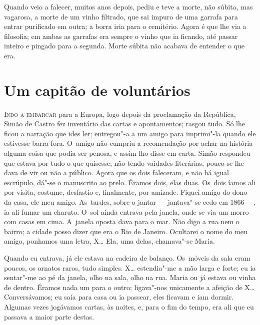 \begin{linenumbers}
Quando veio a falecer, muitos anos depois, pediu e teve a morte, não
súbita, mas vagarosa, a morte de um vinho filtrado, que sai impuro de
uma garrafa para entrar purificado em outra; a borra iria para o
cemitério. Agora é que lhe via a filosofia; em ambas as garrafas era
sempre o vinho que ia ficando, até passar inteiro e pingado para a
segunda. Morte súbita não acabava de entender o que era.

\end{linenumbers}

\chapter{Um capitão de voluntários}

\begin{linenumbers}

\textsc{Indo a embarcar} para a Europa, logo depois da proclamação da República,
Simão de Castro fez inventário das cartas e apontamentos; rasgou tudo.
Só lhe ficou a narração que ides ler; entregou"-a a um amigo para
imprimi"-la quando ele estivesse barra fora. O~amigo não cumpriu a
recomendação por achar na história alguma coisa que podia ser penosa, e
assim lho disse em carta. Simão respondeu que estava por tudo o que
quisesse; não tendo vaidades literárias, pouco se lhe dava de vir ou não
a público. Agora que os dois faleceram, e não há igual escrúpulo, dá"-se
o manuscrito ao prelo. Éramos dois, elas duas. Os~dois íamos ali por
visita, costume, desfastio e, finalmente, por amizade. Fiquei amigo do
dono da casa, ele meu amigo. As~tardes, sobre o jantar --- jantava"-se
cedo em 1866 ---, ia ali fumar um charuto. O~sol ainda entrava pela
janela, onde se via um morro com casas em cima. A~janela oposta dava
para o mar. Não digo a rua nem o bairro; a cidade posso dizer que era o
Rio de Janeiro. Ocultarei o nome do meu amigo, ponhamos uma letra, X\ldots{}
Ela, uma delas, chamava"-se Maria.

Quando eu entrava, já ele estava na cadeira de balanço. Os~móveis da
sala eram poucos, os ornatos raros, tudo simples. X\ldots{} estendia"-me a mão
larga e forte; eu ia sentar"-me ao pé da janela, olho na sala, olho na
rua. Maria ou já estava ou vinha de dentro. Éramos nada um para o outro;
ligava"-nos unicamente a afeição de X\ldots{} Conversávamos; eu saía para casa
ou ia passear, eles ficavam e iam dormir. Algumas vezes jogávamos
cartas, às noites, e, para o fim do tempo, era ali que eu passava a
maior parte destas.


\end{linenumbers}
